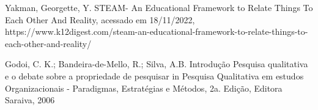\documentclass[
12pt,		%
openright,	%
twoside,  %
a4paper,			%
chapter=TITLE,		%
english,			%
french,				%
spanish,			%
brazil				%
]{USPSC-classe/USPSC}
\begin{document}
\begin{flushleft}
\begin{flushleft}
\begin{flushleft}
\begin{flushleft}
\begin{flushleft}
\begin{flushleft}
\begin{flushleft}
\begin{flushleft}
\begin{flushleft}
[YAKMAN, 2019] Yakman, Georgette, Y. STEAM- An Educational Framework to Relate Things To Each Other And Reality, acessado em 18/11/2022, https://www.k12digest.com/steam-an-educational-framework-to-relate-things-to-each-other-and-reality/
\end{flushleft}


\end{flushleft}


\end{flushleft}


\end{flushleft}


\end{flushleft}


\end{flushleft}


\end{flushleft}


\end{flushleft}


\end{flushleft}


\begin{flushleft}
\begin{flushleft}
\begin{flushleft}
\begin{flushleft}
\begin{flushleft}
\begin{flushleft}
\begin{flushleft}
\begin{flushleft}
\begin{flushleft}
[GODOI et al., 2006] Godoi, C. K.; Bandeira-de-Mello, R.; Silva, A.B. Introdu\c{c}\~ao Pesquisa qualitativa e o debate sobre a propriedade de pesquisar in Pesquisa Qualitativa em estudos Organizacionais - Paradigmas, Estrat\'egias e M\'etodos, 2a. Edi\c{c}\~ao, Editora Saraiva, 2006
\end{flushleft}


\end{flushleft}


\end{flushleft}


\end{flushleft}


\end{flushleft}


\end{flushleft}


\end{flushleft}


\end{flushleft}


\end{flushleft}
\end{document}
